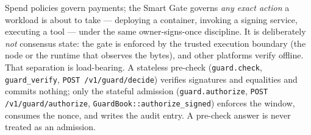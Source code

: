 \documentclass{article}
\begin{document}
Spend policies govern payments; the Smart Gate governs \emph{any exact action}
a workload is about to take --- deploying a container, invoking a signing
service, executing a tool --- under the same owner-signs-once discipline. It
is deliberately \emph{not} consensus state: the gate is enforced by the
trusted execution boundary (the node or the runtime that observes the bytes),
and other platforms verify offline. That separation is load-bearing. A
stateless pre-check (\texttt{guard.check}, \texttt{guard\_verify},
\texttt{POST /v1/guard/decide}) verifies signatures and equalities and commits
nothing; only the stateful admission (\texttt{guard.authorize},
\texttt{POST /v1/guard/authorize}, \texttt{GuardBook::authorize\_signed})
enforces the window, consumes the nonce, and writes the audit entry. A
pre-check answer is never treated as an admission.
\end{document}

